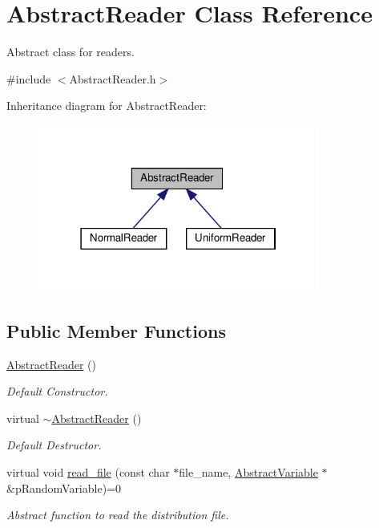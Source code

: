 \hypertarget{classAbstractReader}{}\section{Abstract\+Reader Class Reference}
\label{classAbstractReader}


Abstract class for readers.  




{\ttfamily \#include $<$Abstract\+Reader.\+h$>$}



Inheritance diagram for Abstract\+Reader\+:\nopagebreak
\begin{figure}[H]
\begin{center}
\leavevmode
\includegraphics[width=262pt]{classAbstractReader__inherit__graph}
\end{center}
\end{figure}
\subsection*{Public Member Functions}
\begin{DoxyCompactItemize}
\item 
\mbox{\label{classAbstractReader_afe9629707ae2c68bd9d10cc094dfcfc5}} 
\hyperlink{classAbstractReader_afe9629707ae2c68bd9d10cc094dfcfc5}{Abstract\+Reader} ()
\begin{DoxyCompactList}\small\item\em Default Constructor. \end{DoxyCompactList}\item 
\mbox{\label{classAbstractReader_a18b9335ebe51ba66d0f449f95903f0dc}} 
virtual \hyperlink{classAbstractReader_a18b9335ebe51ba66d0f449f95903f0dc}{$\sim$\+Abstract\+Reader} ()
\begin{DoxyCompactList}\small\item\em Default Destructor. \end{DoxyCompactList}\item 
virtual void \hyperlink{classAbstractReader_a01d009f3633d0af6d9ea8e34defda7f5}{read\+\_\+file} (const char $\ast$file\+\_\+name, \hyperlink{classAbstractVariable}{Abstract\+Variable} $\ast$\&p\+Random\+Variable)=0
\begin{DoxyCompactList}\small\item\em Abstract function to read the distribution file. \end{DoxyCompactList}\end{DoxyCompactItemize}



